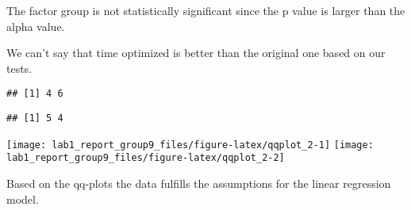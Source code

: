 \documentclass[
]{article}
\begin{document}
The factor group is not statistically significant since the p value is
larger than the alpha value.

We can't say that time optimized is better than the original one based
on our tests.

\begin{verbatim}
## [1] 4 6
\end{verbatim}

\begin{verbatim}
## [1] 5 4
\end{verbatim}

\texttt{[image: lab1\_report\_group9\_files/figure-latex/qqplot\_2-1]}
\texttt{[image: lab1\_report\_group9\_files/figure-latex/qqplot\_2-2]}

Based on the qq-plots the data fulfills the assumptions for the linear
regression model.
\end{document}
